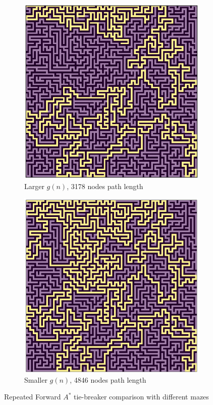\begin{figure}[ht]
\linebreak
\linebreak
\begin{subfigure}{.5\textwidth}
  \centering
  \includegraphics[width=0.8\linewidth]{Report/Part2/larger_g_forward_3178.png}  
  \caption{Larger $g(n)$, 3178 nodes path length}
\end{subfigure}
\begin{subfigure}{.5\textwidth}
  \centering
  \includegraphics[width=0.8\linewidth]{Report/Part2/smaller_g_forward_4846.png}  
  \caption{Smaller $g(n)$, 4846 nodes path length}
\end{subfigure}
\caption{Repeated Forward $A^*$ tie-breaker comparison with different mazes}
\end{figure}